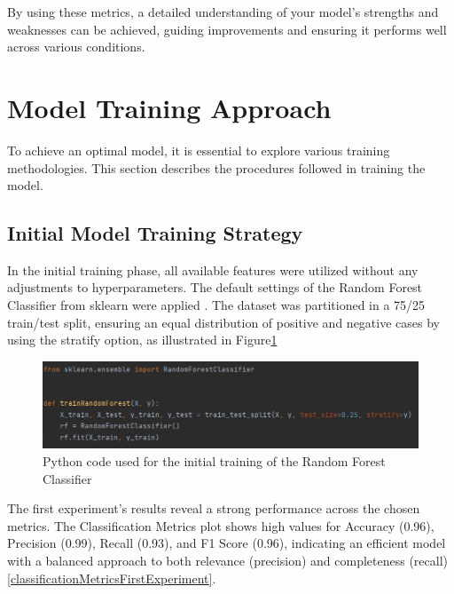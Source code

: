 By using these metrics, a detailed understanding of your model's strengths and weaknesses can be achieved, guiding improvements and ensuring it performs well across various conditions.

\section{Model Training Approach}

\quad To achieve an optimal model, it is essential to explore various training methodologies. This section describes the procedures followed in training the model.

\subsection{Initial Model Training Strategy}

\quad In the initial training phase, all available features were utilized without any adjustments to hyperparameters. The default settings of the Random Forest Classifier from sklearn were applied \cite{sklearn_api}. The dataset was partitioned in a 75/25 train/test split, ensuring an equal distribution of positive and negative cases by using the stratify option, as illustrated in Figure\ref{codeTrainRF}

\begin{figure}[htbp]
	\centering
		\includegraphics[scale=0.6]{LaTeX Bachelor Thesis Depression Signs Detection/figures/codeTrainingRF.png}
	\caption{Python code used for the initial training of the Random Forest Classifier}
	\label{codeTrainRF}
\end{figure}

The first experiment's results reveal a strong performance across the chosen metrics. The Classification Metrics plot shows high values for Accuracy (0.96), Precision (0.99), Recall (0.93), and F1 Score (0.96), indicating an efficient model with a balanced approach to both relevance (precision) and completeness (recall) \ref{classificationMetricsFirstExperiment}.

